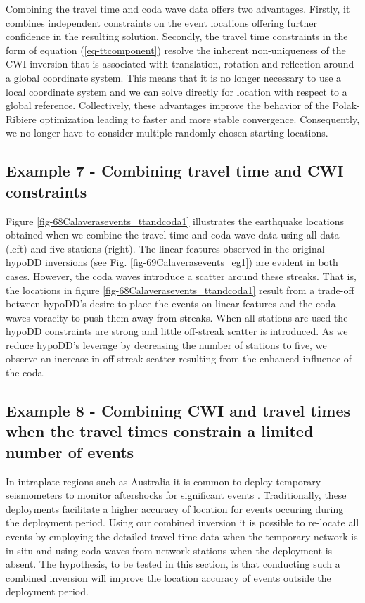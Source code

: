 \documentclass[extra, onecolumn, doublespacing]{gji}
\begin{document}
Combining the travel time and coda wave data offers two advantages.
Firstly, it combines independent constraints on the event locations
offering further confidence in the resulting solution. Secondly, the
travel time constraints in the form of equation
(\ref{eq-ttcomponent}) resolve the inherent non-uniqueness
of the CWI inversion that is associated with translation, rotation and reflection around a global
coordinate system. This means that it is no longer necessary to use
a local coordinate system and we can solve directly for location
with respect to a global reference. Collectively, these advantages
improve the behavior of the Polak-Ribiere optimization leading to
faster and more stable convergence. Consequently, we no longer have
to consider multiple randomly chosen starting locations.


\subsection{Example 7 - Combining travel time and CWI constraints}
 Figure
\ref{fig-68Calaverasevents_ttandcoda1} illustrates the earthquake
locations obtained when we combine the travel time and coda wave
data using all data (left) and five stations (right). The linear
features observed in the original hypoDD inversions (see Fig.
\ref{fig-69Calaverasevents_eg1}) are evident in both cases. However,
the coda waves introduce a scatter around these streaks. That is,
the locations in figure \ref{fig-68Calaverasevents_ttandcoda1}
result from a trade-off between hypoDD's desire to place the events
on linear features and the coda waves voracity to push them away
from streaks. When all stations are used the hypoDD constraints are
strong and little off-streak scatter is introduced. As we reduce
hypoDD's leverage by decreasing the number of stations to five, we
observe an increase in off-streak scatter resulting from the
enhanced influence of the coda.



\subsection{Example 8 - Combining CWI and travel times when the travel times constrain a limited number of events}


In intraplate regions such as Australia it is common to deploy
temporary seismometers to monitor aftershocks for significant events
\citep{dr_Bowman90a, dr_Leonard02a}. Traditionally, these
deployments facilitate a higher accuracy of location for events
occuring during the deployment period. Using our combined inversion
it is possible to re-locate all events by employing the detailed
travel time data when the temporary network is in-situ and using
coda waves from network stations when the deployment is absent. The
hypothesis, to be tested in this section, is that conducting such a
combined inversion will improve the location accuracy of events
outside the deployment period.
\end{document}
